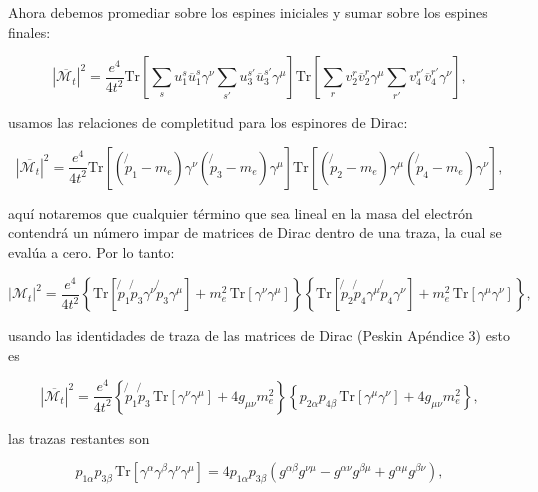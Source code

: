 Ahora debemos promediar sobre los espines iniciales y sumar sobre los espines finales:

\begin{equation}
|\overline{\mathcal{M}_t}|^2 = \frac{e^4}{4t^2} \text{Tr} \left[ \sum_s u_1^s \overline{u}_1^s \gamma^\nu \sum_{s'} u_3^{s'} \overline{u}_3^{s'} \gamma^\mu \right] \text{Tr} \left[ \sum_r v_2^r \overline{v}_2^r \gamma^\mu \sum_{r'} v_4^{r'} \overline{v}_4^{r'} \gamma^\nu \right],
\end{equation}

usamos las relaciones de completitud para los espinores de Dirac:

\begin{equation}
|\overline{\mathcal{M}_t}|^2 = \frac{e^4}{4t^2} \text{Tr} \left[ (\not{p}_1 - m_e) \gamma^\nu (\not{p}_3 - m_e) \gamma^\mu \right] \text{Tr} \left[ (\not{p}_2 - m_e) \gamma^\mu (\not{p}_4 - m_e) \gamma^\nu \right],
\end{equation}

aquí notaremos que cualquier término que sea lineal en la masa del electrón contendrá un número impar de matrices de Dirac dentro de una traza, la cual se evalúa a cero. Por lo tanto:

\begin{equation}
|\mathcal{M}_t|^2 = \frac{e^4}{4t^2} \left\{ \text{Tr} \left[ \not{p}_1 \not{p}_3 \gamma^\nu \not{p}_3 \gamma^\mu \right] + m_e^2 \, \text{Tr} \left[ \gamma^\nu \gamma^\mu \right] \right\} \left\{ \text{Tr} \left[ \not{p}_2 \not{p}_4 \gamma^\mu \not{p}_4 \gamma^\nu \right] + m_e^2 \, \text{Tr} \left[ \gamma^\mu \gamma^\nu \right] \right\},
\end{equation}

usando las identidades de traza de las matrices de Dirac (Peskin Apéndice 3) esto es

\begin{equation}
|\overline{\mathcal{M}_t}|^2 = \frac{e^4}{4t^2} \left\{ \not{p}_1 \not{p}_3 \, \text{Tr} \left[ \gamma^\nu \gamma^\mu \right] + 4 g_{\mu \nu} m_e^2 \right\} \left\{  p_{2\alpha} p_{4\beta} \, \text{Tr} \left[ \gamma^\mu \gamma^\nu \right] + 4 g_{\mu \nu} m_e^2 \right\},
\end{equation}

las trazas restantes son

\begin{equation}
p_{1\alpha} p_{3\beta} \, \text{Tr} \left[ \gamma^\alpha \gamma^\beta \gamma^\nu \gamma^\mu \right] = 4 p_{1 \alpha} p_{3 \beta} \left( g^{\alpha \beta} g^{\nu \mu} - g^{\alpha \nu} g^{\beta \mu} + g^{\alpha \mu} g^{\beta \nu} \right),
\end{equation}

